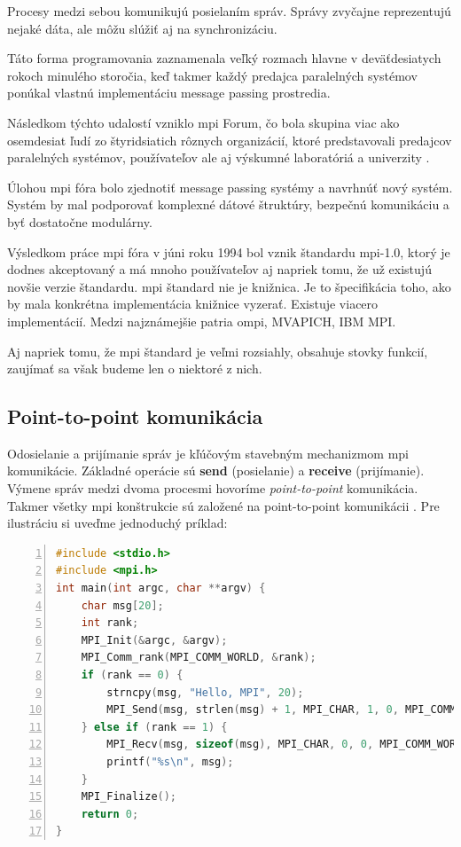 Procesy medzi sebou komunikujú posielaním správ.
Správy zvyčajne reprezentujú nejaké dáta, ale môžu slúžiť aj na synchronizáciu.

Táto forma programovania zaznamenala veľký rozmach hlavne v deväťdesiatych rokoch minulého storočia,
keď takmer každý predajca paralelných systémov ponúkal vlastnú implementáciu message passing prostredia.

Následkom týchto udalostí vzniklo \acrfull{mpi} Forum, čo bola skupina viac ako osemdesiat ľudí zo štyridsiatich rôznych organizácií,
ktoré predstavovali predajcov paralelných systémov, používateľov ale aj výskumné laboratóriá a univerzity \cite{mpibook}.

Úlohou \acrshort{mpi} fóra bolo zjednotiť message passing systémy a navrhnúť nový systém.
Systém by mal podporovať komplexné dátové štruktúry, bezpečnú komunikáciu a byť dostatočne modulárny.

Výsledkom práce \acrshort{mpi} fóra v júni roku 1994 bol vznik štandardu \acrshort{mpi}-1.0,
ktorý je dodnes akceptovaný a má mnoho používateľov aj napriek tomu, že už existujú novšie verzie štandardu.
\acrshort{mpi} štandard nie je knižnica. Je to špecifikácia toho, ako by mala konkrétna implementácia knižnice vyzerať.
Existuje viacero implementácií. Medzi najznámejšie patria \acrshort{ompi}, MVAPICH, IBM MPI.

Aj napriek tomu, že \acrshort{mpi} štandard je veľmi rozsiahly, obsahuje stovky funkcií, zaujímať sa však budeme len o niektoré z nich.

\subsection{Point-to-point komunikácia}
Odosielanie a prijímanie správ je kľúčovým stavebným mechanizmom \acrshort{mpi} komunikácie.
Základné operácie sú \textbf{send} (posielanie) a \textbf{receive} (prijímanie).
Výmene správ medzi dvoma procesmi hovoríme \textit{point-to-point} komunikácia.
Takmer všetky \acrshort{mpi} konštrukcie sú založené na point-to-point komunikácii \cite{mpi3-1}.
Pre ilustráciu si uveďme jednoduchý príklad:

\begin{lstlisting}[language=c, caption={Point-to-point komunikácia}, label={mpi:1}, numbers=left]
#include <stdio.h>
#include <mpi.h>
int main(int argc, char **argv) {
    char msg[20];
    int rank;
    MPI_Init(&argc, &argv);
    MPI_Comm_rank(MPI_COMM_WORLD, &rank);
    if (rank == 0) {
        strncpy(msg, "Hello, MPI", 20);
        MPI_Send(msg, strlen(msg) + 1, MPI_CHAR, 1, 0, MPI_COMM_WORLD);
    } else if (rank == 1) {
        MPI_Recv(msg, sizeof(msg), MPI_CHAR, 0, 0, MPI_COMM_WORLD, MPI_STATUS_IGNORE);
        printf("%s\n", msg);
    }
    MPI_Finalize();
    return 0;
}
\end{lstlisting}

